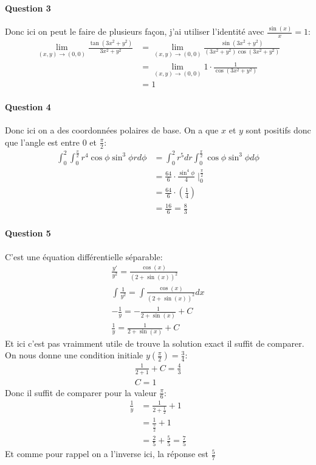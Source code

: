 \documentclass[a4paper]{article}
\begin{document}
\paragraph{Question 3}
Donc ici on peut le faire de plusieurs façon, j'ai utiliser l'identité avec $\frac{\sin\left(x\right)}{x} = 1$:
\begin{align*} 
	\lim_{\left(x, y\right) \to \left(0, 0\right)} \frac{\tan\left(3x^2 + y^2\right)}{3x^2 + y^2} &= \lim_{\left(x, y\right) \to \left(0, 0\right)} \frac{\sin\left(3x^2 + y^2\right)}{\left(3x^2 + y^2\right)\cos\left(3x^2 + y^2\right)}\\
												      &= \lim_{\left(x, y\right) \to \left(0, 0\right)} 1 \cdot  \frac{1}{\cos\left(3x^2 + y^2\right)} \\ &= 1
\end{align*}
\paragraph{Question 4}
Donc ici on a des coordonnées polaires de base. On a que $x$ et $y$ sont positifs donc que l'angle est entre $0$ et $\frac{\pi}{2}$:
\begin{align*} 
	\int_0^2\int_0^{\frac{\pi}{2}}r^4 \cos\phi\sin^3\phi r d\phi &= \int_0^2 r^5 dr \int_0^{\frac{\pi}{2}}\cos \phi \sin^3\phi d\phi\\
								     &= \frac{64}{6}\cdot \frac{\sin^4\phi}{4} \mid_0^{\frac{\pi}{2}}\\
								     &= \frac{64}{6} \cdot  \left(\frac{1}{4}\right)\\
								     &= \frac{16}{6} = \frac{8}{3}
\end{align*}

\paragraph{Question 5}
C'est une équation différentielle séparable:
\begin{align*} 
	\frac{y'}{y^2} = \frac{\cos\left(x\right)}{\left(2 + \sin\left(x\right)\right)^2}\\
	\int \frac{1}{y^2} =  \int \frac{\cos\left(x\right)}{\left(2 + \sin\left(x\right)\right)^2}dx\\
	- \frac{1}{y} = - \frac{1}{2 + \sin\left(x\right)} + C\\
	\frac{1}{y} = \frac{1}{2 + \sin\left(x\right)} + C
\end{align*}
Et ici c'est pas vraimment utile de trouve la solution exact il suffit de comparer. On nous donne une condition initiale $y\left(\frac{\pi}{2}\right) = \frac{3}{4}$:
\begin{align*} 
     \frac{1}{2 + 1} + C = \frac{4}{3}\\
      C = 1
\end{align*}
Donc il suffit de comparer pour la valeur $\frac{\pi}{6}$: 
\begin{align*} 
	\frac{1}{y} &= \frac{1}{2 + \frac{1}{2}} + 1\\
 &= \frac{1}{\frac{5}{2}} + 1\\
 &= \frac{2}{5} + \frac{5}{5} = \frac{7}{5}
\end{align*}
Et comme pour rappel on a l'inverse ici, la réponse est $\frac{5}{7}$
\end{document}
